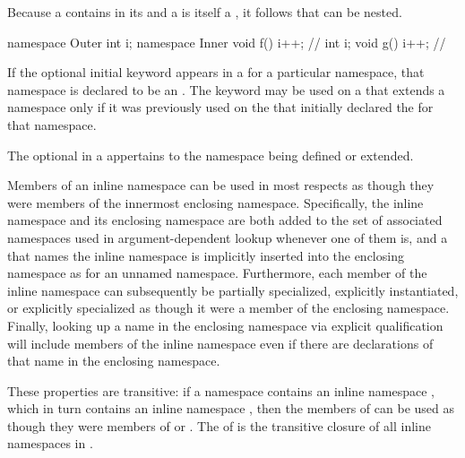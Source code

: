 \pnum
Because a  contains
 in its  and a
 is itself a , it
follows that  can be nested.
\begin{example}
\begin{codeblock}
namespace Outer {
  int i;
  namespace Inner {
    void f() { i++; }           // 
    int i;
    void g() { i++; }           // 
  }
}
\end{codeblock}
\end{example}

\pnum
If the optional initial  keyword appears in a
 for a particular namespace, that namespace is
declared to be an . The  keyword may be
used on a  that extends a namespace
only if it was previously used on the 
that initially declared the  for that namespace.

\pnum
The optional 
in a 
appertains to the namespace being defined or extended.

\pnum
Members of an inline namespace can be used in most respects as though they were members
of the innermost enclosing namespace. Specifically, the inline namespace and its enclosing
namespace are both added to the set of associated namespaces used in
argument-dependent lookup whenever one of them is,
and a  that names the inline
namespace is implicitly inserted into the enclosing namespace as for an unnamed
namespace. Furthermore, each
member of the inline namespace can subsequently be partially
specialized, explicitly
instantiated, or explicitly specialized as
though it were a member of the enclosing namespace. Finally, looking up a name in the
enclosing namespace via explicit qualification will include
members of the inline namespace even if
there are declarations of that name in the enclosing namespace.

\pnum
These properties are transitive: if a namespace  contains an inline namespace
, which in turn contains an inline namespace , then the members of
 can be used as though they were members of  or .
The  of  is the transitive closure of all
inline namespaces in .

